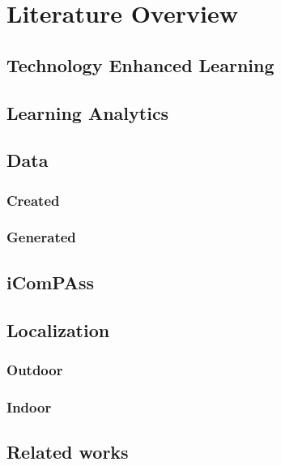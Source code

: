 \documentclass[../Main/thesis.tex]{subfiles}
\begin{document}
\chapter{Literature Overview}
\label{ch:literature_overview}

\section{Technology Enhanced Learning}


\section{Learning Analytics} 


\section{Data}

\subsection{Created}

\subsection{Generated}


\section{iComPAss}



\section{Localization}

\subsection{Outdoor}

\subsection{Indoor}

\section{Related works}
\end{document}
